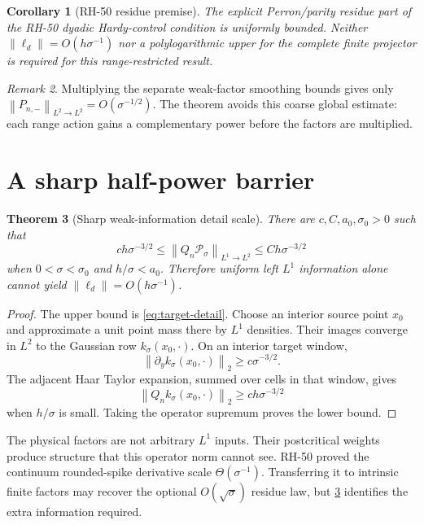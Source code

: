 \documentclass[11pt]{article}
\newtheorem{theorem}{Theorem}[section]
\newtheorem{corollary}[theorem]{Corollary}
\theoremstyle{remark}
\newtheorem{remark}[theorem]{Remark}
\newcommand{\cP}{\mathcal P}
\newcommand{\norm}[1]{\left\lVert #1\right\rVert}
\begin{document}
\begin{corollary}[RH-50 residue premise]
The explicit Perron/parity residue part of the RH-50 dyadic Hardy-control
condition is uniformly bounded.  Neither
\(\norm{\ell_d}=O(h\sigma^{-1})\) nor a polylogarithmic upper for the
complete finite projector is required for this range-restricted result.
\end{corollary}

\begin{remark}
Multiplying the separate weak-factor smoothing bounds gives only
\(\norm{P_{n,-}}_{L^2\to L^2}=O(\sigma^{-1/2})\).  The theorem avoids this
coarse global estimate: each range action gains a complementary power
before the factors are multiplied.
\end{remark}

\section{A sharp half-power barrier}

\begin{theorem}[Sharp weak-information detail scale]
\label{thm:barrier}
There are \(c,C,a_0,\sigma_0>0\) such that
\begin{equation}
 c h\sigma^{-3/2}
 \le\norm{Q_n\cP_\sigma}_{L^1\to L^2}
 \le C h\sigma^{-3/2}
 \label{eq:barrier}
\end{equation}
when \(0<\sigma<\sigma_0\) and \(h/\sigma<a_0\).  Therefore uniform left
\(L^1\) information alone cannot yield
\(\norm{\ell_d}=O(h\sigma^{-1})\).
\end{theorem}

\begin{proof}
The upper bound is \eqref{eq:target-detail}.  Choose an interior source
point \(x_0\) and approximate a unit point mass there by \(L^1\) densities.
Their images converge in \(L^2\) to the Gaussian row
\(k_\sigma(x_0,\cdot)\).  On an interior target window,
\[
 \norm{\partial_yk_\sigma(x_0,\cdot)}_2\ge c\sigma^{-3/2}.
\]
The adjacent Haar Taylor expansion, summed over cells in that window,
gives
\[
 \norm{Q_nk_\sigma(x_0,\cdot)}_2
 \ge c h\sigma^{-3/2}
\]
when \(h/\sigma\) is small.  Taking the operator supremum proves the lower
bound.
\end{proof}

The physical factors are not arbitrary \(L^1\) inputs.  Their
postcritical weights produce structure that this operator norm cannot see.
RH-50 proved the continuum rounded-spike derivative scale
\(\Theta(\sigma^{-1})\).  Transferring it to intrinsic finite factors may
recover the optional \(O(\sqrt\sigma)\) residue law, but
\cref{thm:barrier} identifies the extra information required.
\end{document}
